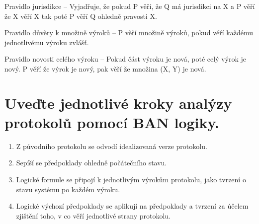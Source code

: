 Pravidlo jurisdikce -- Vyjadřuje, že pokud P věří, že Q má jurisdikci na X a P věří že X věří X tak poté P věří Q ohledně pravosti X.

Pravidlo důvěry k množině výroků -- P věří množině výroků, pokud věří každému jednotlivému výroku zvlášť.

Pravidlo novosti celého výroku -- Pokud část výroku je nová, poté celý výrok je nový. P věří že výrok je nový, pak věří že množina (X, Y) je nová.

\section{Uveďte jednotlivé kroky analýzy protokolů pomocí BAN logiky.}

\begin{enumerate}
    \item Z původního protokolu se odvodí idealizovaná verze protokolu.
    \item Sepíší se předpoklady ohledně počátečního stavu.
    \item Logické formule se připojí k jednotlivým výrokům protokolu, jako tvrzení o stavu systému po každém výroku.
    \item Logické výchozí předpoklady se aplikují na předpoklady a tvrzení za účelem zjištění toho, v co věří jednotlivé strany protokolu.
\end{enumerate}

